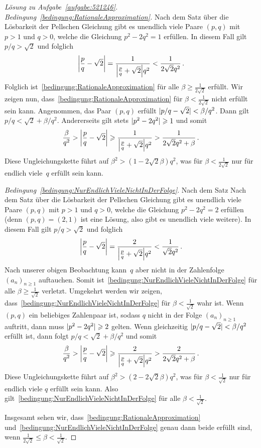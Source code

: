\begin{proof}[Lösung zu Aufgabe~\ref{aufgabe:521246}]
	\emph{Bedingung~\ref{bedingung:RationaleApproximation}.} Nach dem Satz über die Lösbarkeit der Pellschen Gleichung gibt es unendlich viele Paare $(p,q)$ mit $p>1$ und $q>0$, welche die Gleichung $p^2-2q^2=1$ erfüllen. In diesem Fall gilt $p/q>\sqrt{2}$ und folglich
	\begin{equation*}
		\abs*{\frac pq-\sqrt{2}}=\frac{1}{\abs*{\frac{p}{q}+\sqrt{2}}q^2}<\frac{1}{2\sqrt{2}q^2}\,.
	\end{equation*}
	Folglich ist~\ref{bedingung:RationaleApproximation} für alle $\beta\geqslant \frac{1}{2\sqrt{2}}$ erfüllt. Wir zeigen nun, dass~\ref{bedingung:RationaleApproximation} für $\beta<\frac{1}{2\sqrt{2}}$ nicht erfüllt sein kann. Angenommen, das Paar $(p,q)$ erfüllt $\lvert p/q-\sqrt{2}\rvert<\beta/q^2$. Dann gilt $p/q<\sqrt{2}+\beta/q^2$. Andererseits gilt stets $\lvert p^2-2q^2\rvert\geqslant 1$ und somit
	\begin{equation*}
		\frac{\beta}{q^2}>\abs*{\frac pq-\sqrt{2}}\geqslant \frac{1}{\abs*{\frac{p}{q}+\sqrt{2}}q^2}>\frac{1}{2\sqrt{2}q^2+\beta}\,.
	\end{equation*}
	Diese Ungleichungskette führt auf $\beta^2>(1-2\sqrt{2}\beta)q^2$, was für $\beta<\frac1{2\sqrt{2}}$ nur für endlich viele~$q$ erfüllt sein kann.
	
	\emph{Bedingung~\ref{bedingung:NurEndlichVieleNichtInDerFolge}}. Nach dem Satz Nach dem Satz über die Lösbarkeit der Pellschen Gleichung gibt es unendlich viele Paare $(p,q)$ mit $p>1$ und $q>0$, welche die Gleichung $p^2-2q^2=2$ erfüllen (denn $(p,q)=(2,1)$ ist eine Lösung, also gibt es unendlich viele weitere). In diesem Fall gilt $p/q>\sqrt{2}$ und folglich
	\begin{equation*}
		\abs*{\frac pq-\sqrt{2}}=\frac{2}{\abs*{\frac{p}{q}+\sqrt{2}}q^2}<\frac{1}{\sqrt{2}q^2}\,.
	\end{equation*}
	Nach unserer obigen Beobachtung kann~$q$ aber nicht in der Zahlenfolge $(a_n)_{n\geqslant 1}$ auftauchen. Somit ist~\ref{bedingung:NurEndlichVieleNichtInDerFolge} für alle $\beta\geqslant \frac{1}{\sqrt{2}}$ verletzt. Umgekehrt werden wir zeigen, dass~\ref{bedingung:NurEndlichVieleNichtInDerFolge} für $\beta<\frac{1}{\sqrt{2}}$ wahr ist. Wenn $(p,q)$ ein beliebiges Zahlenpaar ist, sodass $q$ nicht in der Folge $(a_n)_{n\geqslant 1}$ auftritt, dann muss $\lvert p^2-2q^2\rvert\geqslant 2$ gelten. Wenn gleichzeitig $\lvert p/q-\sqrt{2}\rvert<\beta/q^2$ erfüllt ist, dann folgt $p/q<\sqrt{2}+\beta/q^2$ und somit
	\begin{equation*}
		\frac{\beta}{q^2}>\abs*{\frac pq-\sqrt{2}}\geqslant \frac{2}{\abs*{\frac{p}{q}+\sqrt{2}}q^2}>\frac{2}{2\sqrt{2}q^2+\beta}\,.
	\end{equation*}
	Diese Ungleichungskette führt auf $\beta^2>(2-2\sqrt{2}\beta)q^2$, was für $\beta<\frac1{\sqrt{2}}$ nur für endlich viele $q$ erfüllt sein kann. Also gilt~\ref{bedingung:NurEndlichVieleNichtInDerFolge} für alle $\beta<\frac{1}{\sqrt{2}}$.
	
	Insgesamt sehen wir, dass~\ref{bedingung:RationaleApproximation} und~\ref{bedingung:NurEndlichVieleNichtInDerFolge} genau dann beide erfüllt sind, wenn $\frac{1}{2\sqrt{2}}\leqslant \beta<\frac{1}{\sqrt{2}}$.
\end{proof}